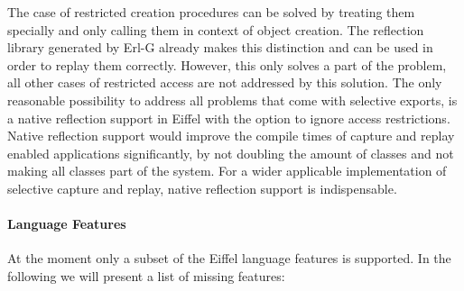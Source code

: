 The case of restricted creation procedures can be solved by treating them specially and only calling them in context of object creation. The reflection library generated by Erl-G already makes this distinction and can be used in order to replay them correctly. However, this only solves a part of the problem, all other cases of restricted access are not addressed by this solution. The only reasonable possibility to address all problems that come with selective exports, is a native reflection support in Eiffel with the option to ignore access restrictions. Native reflection support would improve the compile times of capture and replay enabled applications significantly, by not doubling the amount of classes and not making all classes part of the system. For a wider applicable implementation of selective capture and replay, native reflection support is indispensable.

\paragraph{Language Features}
At the moment only a subset of the Eiffel language features is supported. In the following we will present a list of missing features:

